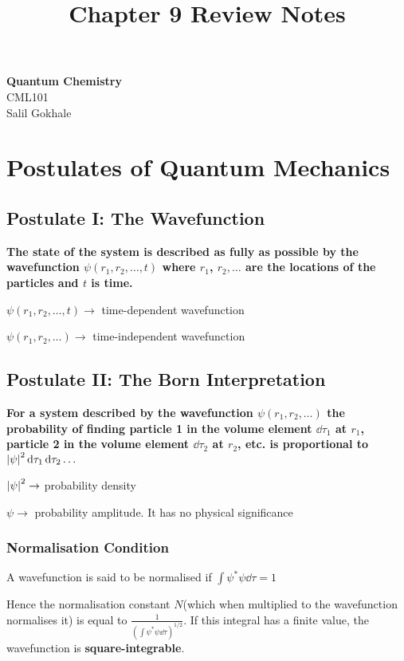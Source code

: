 \documentclass[11pt]{article}
\theoremstyle{definition}
\begin{document}
\setcounter{section}{8}
\title{Chapter 9 Review Notes}

\thispagestyle{empty}

\begin{center}
{\LARGE \bf Quantum Chemistry}\\
{\large CML101}\\
Salil Gokhale
\end{center}

\section{Postulates of Quantum Mechanics}
\subsection{Postulate I: The Wavefunction}

\textbf{The state of the system is described as fully as possible by the wavefunction $\psi(r_1, r_2,\dots ,t)$ where $r_1$, $r_2, \dots$ are the locations of the particles and $t$ is time.}

$\psi(r_1, r_2,\dots ,t) \rightarrow$ time-dependent wavefunction

$\psi(r_1, r_2,\dots) \rightarrow$ time-independent wavefunction

\subsection{Postulate II: The Born Interpretation} 
\textbf{For a system described by the wavefunction $\psi(r_1, r_2, \dots)$ the probability of finding particle 1 in the volume element $\dd{\tau_1}$ at $r_1$, particle 2 in the volume element $\dd{\tau_2}$ at $r_2$, etc. is proportional to $\abs{\psi}^2 \dd{\tau_1} \dd{\tau_2} \dots$}

$\abs{\psi}^2 \rightarrow$ probability density

$\psi \rightarrow$ probability amplitude. It has no physical significance 

\subsubsection{Normalisation Condition} 

A wavefunction is said to be normalised if $\int \psi^* \psi \dd{\tau} =1$

Hence the normalisation constant $N$(which when multiplied to the wavefunction normalises it) is equal to $\frac{1}{\left(\int \psi^* \psi \dd{\tau} \right)^{1/2}}$. If this integral has a finite value, the wavefunction is \textbf{square-integrable}.
\end{document}
